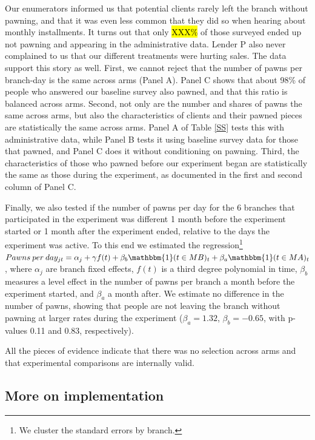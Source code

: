 \documentclass[oneside,11pt]{article}
\begin{document}
Our enumerators informed us that potential clients rarely left the branch without pawning, and that it was even less common that they did so when hearing about monthly installments. It turns out that only \hl{XXX\%} of those surveyed ended up not pawning and appearing in the administrative data. Lender P also never complained to us that our different treatments were hurting sales. The data support this story as well. First, we cannot reject that the number of pawns per branch-day is the same across arms (Panel A). Panel C shows that about 98\% of people who answered our baseline survey also pawned, and that this ratio is balanced across arms. Second, not only are the number and shares of pawns the same across arms, but also the characteristics of clients and their pawned pieces are statistically the same across arms. Panel A of Table \ref{SS} tests this with administrative data, while Panel B tests it using baseline survey data for those that pawned, and Panel C does it without conditioning on pawning. %
Third, the characteristics of those who pawned before our experiment began are statistically the same as those during the experiment, as documented in the first and second column of Panel C.

Finally, we also tested if the number of pawns per day for the 6 branches that participated in the experiment was different 1 month before the experiment started or 1 month after the experiment ended, relative to the days the experiment was active. To this end we estimated the regression\footnote{We cluster the standard errors by branch.} $Pawns \: per \: day_{jt} = \alpha_j + \gamma f(t) + \beta_b \mathbbm{1}(t \in MB)_{t} +\beta_a \mathbbm{1}(t \in MA)_{t}$, where $\alpha_j$ are branch fixed effects, $f(t)$ is a third degree polynomial in time, $\beta_b$ measures a level effect in the number of pawns per branch a month before the experiment started, and $\beta_a$ a month after. We estimate no difference in the number of pawns, showing that people are not leaving the branch without pawning at larger rates during the experiment ($\beta_a=1.32$, $\beta_b=-0.65$, with p-values 0.11 and 0.83, respectively). 

All the pieces of evidence indicate that there was no selection across arms and that experimental comparisons are internally valid.

    
\subsection{More on implementation} \label{implementation}
\end{document}
